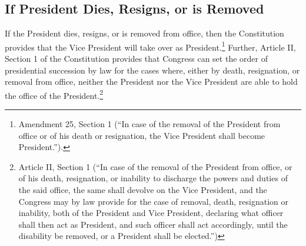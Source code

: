 \subsection{If President Dies, Resigns, or is Removed}
If the President dies, resigns, or is removed from office, then the Constitution provides that the Vice President will take over as President.\footnote{Amendment 25, Section 1 (``In case of the removal of the President from office or of his death or resignation, the Vice President shall become President.'').}
Further, Article II, Section 1 of the Constitution provides that Congress can set the order of presidential succession by law for the cases where, either by death, resignation, or removal from office, neither the President nor the Vice President are able to hold the office of the President.\footnote{Article II, Section 1 (``In case of the removal of the President from office, or of his death, resignation, or inability to discharge the powers and duties of the said office, the same shall devolve on the Vice President, and the Congress may by law provide for the case of removal, death, resignation or inability, both of the President and Vice President, declaring what officer shall then act as President, and such officer shall act accordingly, until the disability be removed, or a President shall be elected.'')}


